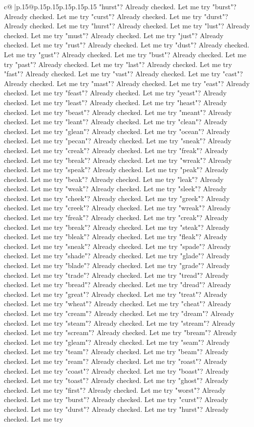 \documentclass{article}
\begin{document}
{\begin{supertabular}{c@{$\;$}|p{.15\linewidth}@{}p{.15\linewidth}p{.15\linewidth}p{.15\linewidth}p{.15\linewidth}p{.15\linewidth}}
{{{"hurst"? Already checked. Let me try "burst"? Already checked. Let me try "curst"? Already checked. Let me try "durst"? Already checked. Let me try "hurst"? Already checked. Let me try "lust"? Already checked. Let me try "must"? Already checked. Let me try "just"? Already checked. Let me try "rust"? Already checked. Let me try "dust"? Already checked. Let me try "gust"? Already checked. Let me try "bust"? Already checked. Let me try "past"? Already checked. Let me try "last"? Already checked. Let me try "fast"? Already checked. Let me try "vast"? Already checked. Let me try "cast"? Already checked. Let me try "mast"? Already checked. Let me try "east"? Already checked. Let me try "feast"? Already checked. Let me try "yeast"? Already checked. Let me try "least"? Already checked. Let me try "heast"? Already checked. Let me try "beast"? Already checked. Let me try "meant"? Already checked. Let me try "leant"? Already checked. Let me try "clean"? Already checked. Let me try "glean"? Already checked. Let me try "ocean"? Already checked. Let me try "pecan"? Already checked. Let me try "sneak"? Already checked. Let me try "creak"? Already checked. Let me try "freak"? Already checked. Let me try "break"? Already checked. Let me try "wreak"? Already checked. Let me try "speak"? Already checked. Let me try "peak"? Already checked. Let me try "beak"? Already checked. Let me try "leak"? Already checked. Let me try "weak"? Already checked. Let me try "sleek"? Already checked. Let me try "cheek"? Already checked. Let me try "greek"? Already checked. Let me try "creek"? Already checked. Let me try "wreak"? Already checked. Let me try "freak"? Already checked. Let me try "creak"? Already checked. Let me try "break"? Already checked. Let me try "steak"? Already checked. Let me try "bleak"? Already checked. Let me try "fleak"? Already checked. Let me try "sneak"? Already checked. Let me try "spade"? Already checked. Let me try "shade"? Already checked. Let me try "glade"? Already checked. Let me try "blade"? Already checked. Let me try "grade"? Already checked. Let me try "trade"? Already checked. Let me try "tread"? Already checked. Let me try "bread"? Already checked. Let me try "dread"? Already checked. Let me try "great"? Already checked. Let me try "treat"? Already checked. Let me try "wheat"? Already checked. Let me try "cheat"? Already checked. Let me try "cream"? Already checked. Let me try "dream"? Already checked. Let me try "steam"? Already checked. Let me try "stream"? Already checked. Let me try "scream"? Already checked. Let me try "bream"? Already checked. Let me try "gleam"? Already checked. Let me try "seam"? Already checked. Let me try "team"? Already checked. Let me try "beam"? Already checked. Let me try "ream"? Already checked. Let me try "roast"? Already checked. Let me try "coast"? Already checked. Let me try "boast"? Already checked. Let me try "toast"? Already checked. Let me try "ghost"? Already checked. Let me try "first"? Already checked. Let me try "worst"? Already checked. Let me try "burst"? Already checked. Let me try "curst"? Already checked. Let me try "durst"? Already checked. Let me try "hurst"? Already checked. Let me try }}}
\end{supertabular}}
\end{document}

